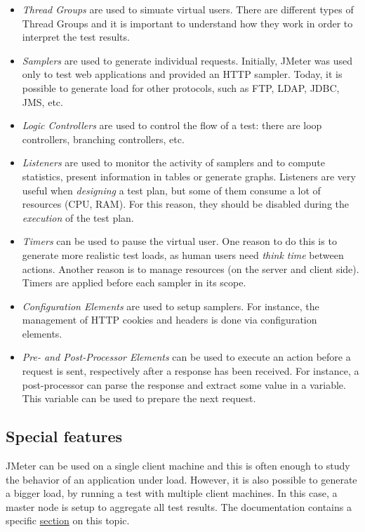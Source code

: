 \begin{itemize}
\item \emph{Thread Groups} are used to simuate virtual users. There are different types of Thread Groups and it is important to understand how they work in order to interpret the test results. 
\item \emph{Samplers} are used to generate individual requests. Initially, JMeter was used only to test web applications and provided an HTTP sampler. Today, it is possible to generate load for other protocols, such as FTP, LDAP, JDBC, JMS, etc.
\item \emph{Logic Controllers} are used to control the flow of a test: there are loop controllers, branching controllers, etc.
\item \emph{Listeners} are used to monitor the activity of samplers and to compute statistics, present information in tables or generate graphs. Listeners are very useful when \emph{designing} a test plan, but some of them consume a lot of resources (CPU, RAM). For this reason, they should be disabled during the \emph{execution} of the test plan.
\item \emph{Timers} can be used to pause the virtual user. One reason to do this is to generate more realistic test loads, as human users need \emph{think time} between actions. Another reason is to manage resources (on the server and client side). Timers are applied before each sampler in its scope.
\item \emph{Configuration Elements} are used to setup samplers. For instance, the management of HTTP cookies and headers is done via configuration elements.
\item \emph{Pre- and Post-Processor Elements} can be used to execute an action before a request is sent, respectively after a response has been received. For instance, a post-processor can parse the response and extract some value in a variable. This variable can be used to prepare the next request. 
\end{itemize}

\subsection{Special features}

JMeter can be used on a single client machine and this is often enough to study the behavior of an application under load. However, it is also possible to generate a bigger load, by running a test with multiple client machines. In this case, a master node is setup to aggregate all test results. The documentation contains a specific \href{https://jmeter.apache.org/usermanual/jmeter_distributed_testing_step_by_step.html}{section} on this topic.

